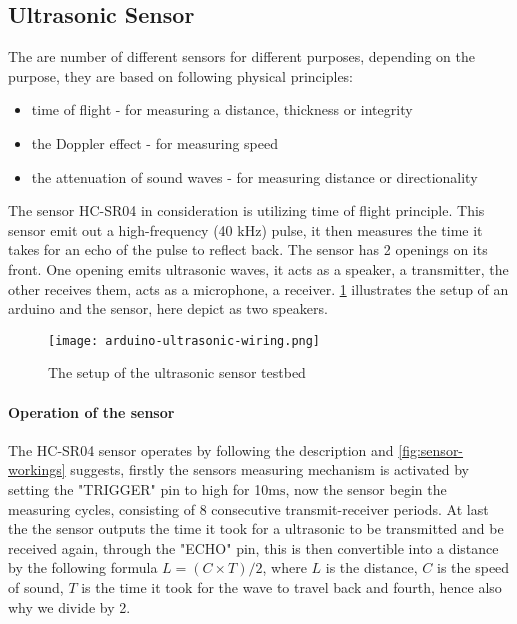 \subsection{Ultrasonic Sensor}\label{sub:ultrasonic}
The are number of different sensors for different purposes, depending on the purpose, they are based on following physical principles:
\begin{itemize}
  \item time of flight - for measuring a distance, thickness or integrity\cite{ultrasound2}
  \item the Doppler effect - for measuring speed\cite{ultrasound}
  \item the attenuation of sound waves - for measuring distance or directionality\cite{ultrasound}
\end{itemize}
The sensor HC-SR04 in consideration is utilizing time of flight principle. This sensor emit out a high-frequency (40 kHz) pulse, it then measures the time it takes for an echo of the pulse to reflect back. The sensor has 2 openings on its front. One opening emits ultrasonic waves, it acts as a speaker, a transmitter, the other receives them, acts as a microphone, a receiver. \cref{fig:ultrasonicwiring} illustrates the setup of an arduino and the sensor, here depict as two speakers. 

\begin{figure}[htbp]
  \centering
  \texttt{[image: arduino-ultrasonic-wiring.png]}
  \caption{The setup of the ultrasonic sensor testbed}
  \label{fig:ultrasonicwiring}
\end{figure}

\paragraph{Operation of the sensor}
The HC-SR04 sensor operates by following the description and \cref{fig:sensor-workings} suggests, firstly the sensors measuring mechanism is activated by setting the "TRIGGER" pin to high for 10$\si{\milli\second}$, now the sensor begin the measuring cycles, consisting of 8 consecutive transmit-receiver periods. At last the the sensor outputs the time it took for a ultrasonic to be transmitted and be received again, through the "ECHO" pin, this is then convertible into a distance by the following formula $L = (C × T)/2$, where $L$ is the distance, $C$ is the speed of sound, $T$ is the time it took for the wave to travel back and fourth, hence also why we divide by 2.

